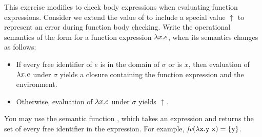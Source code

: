 \begin{exercise}

This exercise modifies \lang to check body expressions when evaluating
function expressions.
Consider we extend the value of \lang to include a special value $\uparrow$
to represent an error during function body checking.
Write the operational semantics of the form
 for a function expression
$\lambda x.e$, when its semantics  changes as follows:
\begin{itemize}
\item If every free identifier of $e$ is in the domain of $\sigma$ or is $x$,
  then evaluation of $\lambda x.e$ under $\sigma$ yields a closure
  containing the function expression and the environment.
\item Otherwise, evaluation of $\lambda x.e$ under $\sigma$ yields $\uparrow$.
\end{itemize}
You may use the semantic function , which takes an
expression and returns the set of every free identifier in the expression.
For example, $\mbox{\emph{fv}}(\lambda\texttt{x}.\texttt{y}\ \texttt{x}) = \{ \texttt{y} \}$.

\end{exercise}

